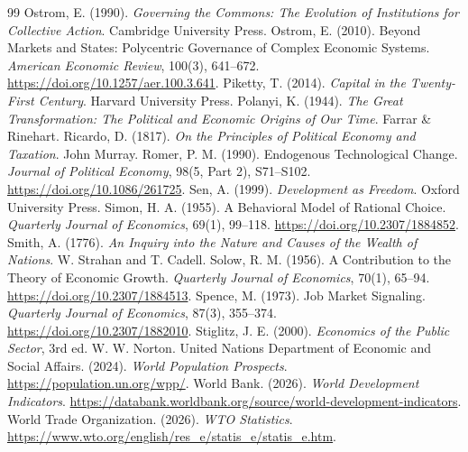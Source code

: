 \documentclass[11pt,oneside,openany]{book}
\begin{document}
\begin{thebibliography}{99}
 Ostrom, E. (1990). \emph{Governing the Commons: The Evolution of Institutions for Collective Action}. Cambridge University Press.
 Ostrom, E. (2010). Beyond Markets and States: Polycentric Governance of Complex Economic Systems. \emph{American Economic Review}, 100(3), 641--672. \url{https://doi.org/10.1257/aer.100.3.641}.
 Piketty, T. (2014). \emph{Capital in the Twenty-First Century}. Harvard University Press.
 Polanyi, K. (1944). \emph{The Great Transformation: The Political and Economic Origins of Our Time}. Farrar \& Rinehart.
 Ricardo, D. (1817). \emph{On the Principles of Political Economy and Taxation}. John Murray.
 Romer, P. M. (1990). Endogenous Technological Change. \emph{Journal of Political Economy}, 98(5, Part 2), S71--S102. \url{https://doi.org/10.1086/261725}.
 Sen, A. (1999). \emph{Development as Freedom}. Oxford University Press.
 Simon, H. A. (1955). A Behavioral Model of Rational Choice. \emph{Quarterly Journal of Economics}, 69(1), 99--118. \url{https://doi.org/10.2307/1884852}.
 Smith, A. (1776). \emph{An Inquiry into the Nature and Causes of the Wealth of Nations}. W. Strahan and T. Cadell.
 Solow, R. M. (1956). A Contribution to the Theory of Economic Growth. \emph{Quarterly Journal of Economics}, 70(1), 65--94. \url{https://doi.org/10.2307/1884513}.
 Spence, M. (1973). Job Market Signaling. \emph{Quarterly Journal of Economics}, 87(3), 355--374. \url{https://doi.org/10.2307/1882010}.
 Stiglitz, J. E. (2000). \emph{Economics of the Public Sector}, 3rd ed. W. W. Norton.
 United Nations Department of Economic and Social Affairs. (2024). \emph{World Population Prospects}. \url{https://population.un.org/wpp/}.
 World Bank. (2026). \emph{World Development Indicators}. \url{https://databank.worldbank.org/source/world-development-indicators}.
 World Trade Organization. (2026). \emph{WTO Statistics}. \url{https://www.wto.org/english/res_e/statis_e/statis_e.htm}.
\end{thebibliography}

\backmatter
\printindex
\end{document}
